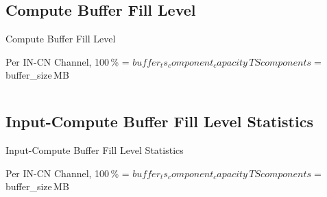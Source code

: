 
\subsection{Compute Buffer Fill Level}
\begin{frame}[fragile]{Compute Buffer Fill Level}
  \begin{center}
        \tiny Per IN-CN Channel, 100\,\% = ${buffer_ts_component_capacity}\,TS components = ${buffer_size}\,MB
  \end{center}
  \begin{columns}[T] %
    \begin{column}{.48\textwidth}
        FLESnet \\
        \texttt{[image: \$\{flesnet\_compute\_all\_buffer\_fill\_level]}}
    \end{column}
    \hfill
    \begin{column}{.48\textwidth}
        DFS \\
        \texttt{[image: \$\{dfs\_compute\_all\_buffer\_fill\_level]}}
    \end{column}
  \end{columns}
\end{frame}


\subsection{Input-Compute Buffer Fill Level Statistics}
\begin{frame}[fragile]{Input-Compute Buffer Fill Level Statistics}
  \begin{center}
        \tiny Per IN-CN Channel, 100\,\% = ${buffer_ts_component_capacity}\,TS components = ${buffer_size}\,MB
  \end{center}
  \begin{columns}[T] %
    \begin{column}{.48\textwidth}
        FLESnet \\
        \texttt{[image: \$\{flesnet\_compute\_all\_buffer\_fill\_level\_statistics]}}
    \end{column}
    \hfill
    \begin{column}{.48\textwidth}
        DFS \\
        \texttt{[image: \$\{dfs\_compute\_all\_buffer\_fill\_level\_statistics]}}
    \end{column}
    \end{columns}
\end{frame}


